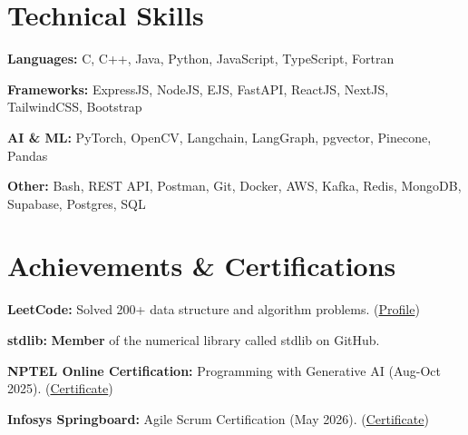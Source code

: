 \documentclass[letterpaper,11pt]{article}
\newcommand{\resumeSubHeadingListStart}{\begin{itemize}[leftmargin=0.15in, label={}]}
\newcommand{\resumeSubHeadingListEnd}{\end{itemize}}
\begin{document}

\section{Technical Skills}
  \vspace{2pt}
  \resumeSubHeadingListStart
    \small{\item{
        
        \textbf{Languages:}{ C, C++, Java, Python, JavaScript, TypeScript, Fortran} \\ \vspace{2pt}
        
        \textbf{Frameworks:}{ ExpressJS, NodeJS, EJS, FastAPI, ReactJS, NextJS, TailwindCSS, Bootstrap} \\ \vspace{2pt}
        
        \textbf{AI \& ML:}{ PyTorch, OpenCV, Langchain, LangGraph, pgvector, Pinecone, Pandas} \\ \vspace{2pt}
        
        \textbf{Other:}{ Bash, REST API, Postman, Git, Docker, AWS, Kafka, Redis, MongoDB, Supabase, Postgres, SQL} \\ \vspace{1pt}
        
    }}
  \resumeSubHeadingListEnd




\section{Achievements \& Certifications}
  \vspace{2pt}
  \resumeSubHeadingListStart
    \small{\item{
        \textbf{LeetCode:}{ Solved 200+ data structure and algorithm problems. (\href{https://leetcode.com/u/kaustubh007/}{Profile})} \\ \vspace{2pt}
        
        \textbf{stdlib:}{ \textbf{Member} of the numerical library called stdlib on GitHub.} \\ \vspace{2pt}
        
        \textbf{NPTEL Online Certification:}{ Programming with Generative AI (Aug-Oct 2025). (\href{https://drive.google.com/file/d/1-zN8Gxmnq5S4PSVZPvqMEsFZuBSUXPpA/view?usp=sharing}{Certificate})} \\ \vspace{2pt}
        
        \textbf{Infosys Springboard:}{ Agile Scrum Certification (May 2026). (\href{https://drive.google.com/file/d/1Ts5yiCCfG0jg3e6VYl33A_S_wrl5y6V4/view?usp=sharing}{Certificate})}
    }}
  \resumeSubHeadingListEnd



\end{document}
